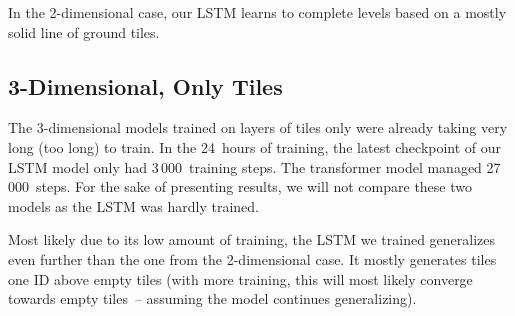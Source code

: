 In the 2-dimensional case, our LSTM learns to complete levels based on
a mostly solid line of ground tiles. 

\subsection{3-Dimensional, Only Tiles}

The 3-dimensional models trained on layers of tiles only were already
taking very long (too long) to train. In the 24~hours of training, the
latest checkpoint of our LSTM model only had 3\,000~training steps.
The transformer model managed 27\,000~steps. For the sake of
presenting results, we will not compare these two models as the LSTM
was hardly trained.

Most likely due to its low amount of training, the LSTM we trained
generalizes even further than the one from the 2-dimensional case. It
mostly generates tiles one ID above empty tiles (with more training,
this will most likely converge towards empty tiles~-- assuming the
model continues generalizing).




